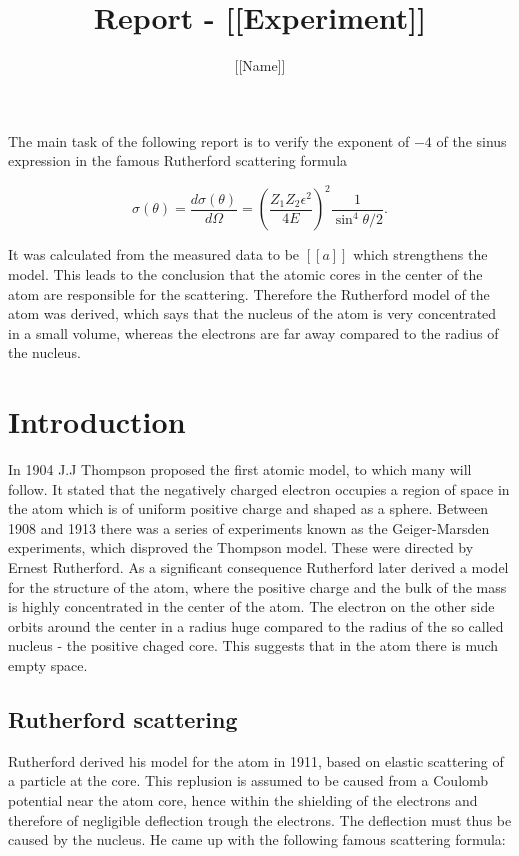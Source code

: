 \documentclass[a4paper]{article}
\author{[[Name]]}
\title{Report - [[Experiment]]}
\begin{document}
\maketitle
\abstract 

The main task of the following report is to verify the exponent of $-4$ of the sinus expression in the famous Rutherford scattering formula

\begin{equation}
\sigma(\theta) = \frac{d\sigma(\theta)}{d\Omega} = \left( \frac{Z_1 Z_2 \epsilon^2}{4E} \right)^2 \frac{1}{\sin^4{\theta / 2}}.
\end{equation}

It was calculated from the measured data to be $[[a]]$ which strengthens the model. This leads to the conclusion that the atomic cores in the center of the atom are responsible for the scattering. Therefore the Rutherford model of the atom was derived, which says that the nucleus of the atom is very concentrated in a small volume, whereas the electrons are far away compared to the radius of the nucleus.

\section{Introduction}

In 1904 J.J Thompson proposed the first atomic model, to which many will follow. It stated that the negatively charged electron occupies a region of space in the atom which is of uniform positive charge and shaped as a sphere. Between 1908 and 1913 there was a series of experiments known as the Geiger-Marsden experiments, which disproved the Thompson model. These were directed by Ernest Rutherford. As a significant consequence Rutherford later derived a model for the structure of the atom, where the positive charge and the bulk of the mass is highly concentrated in the center of the atom. The electron on the other side orbits around the center in a radius huge compared to the radius of the so called nucleus - the positive chaged core. This suggests that in the atom there is much empty space.
\newline

\subsection{Rutherford scattering}
\label{sec:rutherford}

Rutherford derived his model for the atom in 1911, based on elastic scattering of a particle at the core. This replusion is assumed to be caused from a Coulomb potential near the atom core, hence within the shielding of the electrons and therefore of negligible deflection trough the electrons. The deflection must thus be caused by the nucleus. He came up with the following famous scattering formula:
\end{document}
